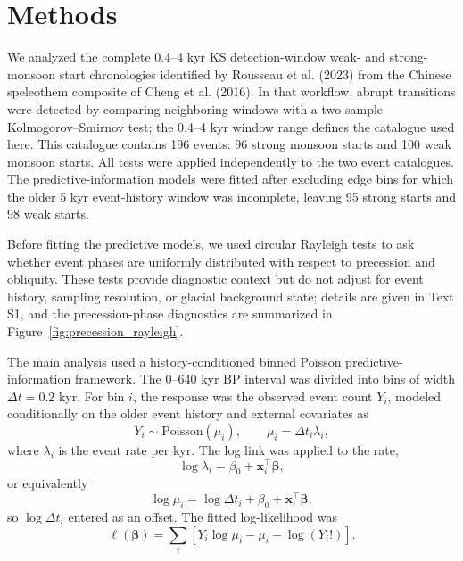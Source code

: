 \documentclass[11pt]{article}
\begin{document}
\section*{Methods}

We analyzed the complete 0.4--4 kyr KS detection-window weak- and strong-monsoon start chronologies identified by Rousseau et al. (2023) from the Chinese speleothem composite of Cheng et al. (2016). In that workflow, abrupt transitions were detected by comparing neighboring windows with a two-sample Kolmogorov--Smirnov test; the 0.4--4 kyr window range defines the catalogue used here. This catalogue contains 196 events: 96 strong monsoon starts and 100 weak monsoon starts. All tests were applied independently to the two event catalogues. The predictive-information models were fitted after excluding edge bins for which the older 5 kyr event-history window was incomplete, leaving 95 strong starts and 98 weak starts.

Before fitting the predictive models, we used circular Rayleigh tests to ask whether event phases are uniformly distributed with respect to precession and obliquity. These tests provide diagnostic context but do not adjust for event history, sampling resolution, or glacial background state; details are given in Text S1, and the precession-phase diagnostics are summarized in Figure~\ref{fig:precession_rayleigh}.

The main analysis used a history-conditioned binned Poisson predictive-information framework. The 0--640 kyr BP interval was divided into bins of width \(\Delta t=0.2\) kyr. For bin \(i\), the response was the observed event count \(Y_i\), modeled conditionally on the older event history and external covariates as
\[
Y_i \sim \mathrm{Poisson}(\mu_i),
\qquad
\mu_i = \Delta t_i \lambda_i ,
\]
where \(\lambda_i\) is the event rate per kyr. The log link was applied to the rate,
\[
\log \lambda_i = \beta_0+\mathbf{x}_i^{\top}\boldsymbol{\beta},
\]
or equivalently
\[
\log \mu_i = \log \Delta t_i+\beta_0+\mathbf{x}_i^{\top}\boldsymbol{\beta},
\]
so \(\log \Delta t_i\) entered as an offset. The fitted log-likelihood was
\[
\ell(\boldsymbol{\beta})=
\sum_i
\left[
Y_i\log\mu_i-\mu_i-\log(Y_i!)
\right].
\]
\end{document}
